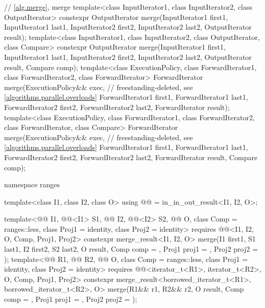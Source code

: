 \begin{codeblock}
{  // \ref{alg.merge}, merge
  template<class InputIterator1, class InputIterator2, class OutputIterator>
    constexpr OutputIterator
      merge(InputIterator1 first1, InputIterator1 last1,
            InputIterator2 first2, InputIterator2 last2,
            OutputIterator result);
  template<class InputIterator1, class InputIterator2, class OutputIterator,
           class Compare>
    constexpr OutputIterator
      merge(InputIterator1 first1, InputIterator1 last1,
            InputIterator2 first2, InputIterator2 last2,
            OutputIterator result, Compare comp);
  template<class ExecutionPolicy, class ForwardIterator1, class ForwardIterator2,
           class ForwardIterator>
    ForwardIterator
      merge(ExecutionPolicy&& exec,                             // freestanding-deleted, see \ref{algorithms.parallel.overloads}
            ForwardIterator1 first1, ForwardIterator1 last1,
            ForwardIterator2 first2, ForwardIterator2 last2,
            ForwardIterator result);
  template<class ExecutionPolicy, class ForwardIterator1, class ForwardIterator2,
           class ForwardIterator, class Compare>
    ForwardIterator
      merge(ExecutionPolicy&& exec,                             // freestanding-deleted, see \ref{algorithms.parallel.overloads}
            ForwardIterator1 first1, ForwardIterator1 last1,
            ForwardIterator2 first2, ForwardIterator2 last2,
            ForwardIterator result, Compare comp);

  namespace ranges {
    template<class I1, class I2, class O>
      using @@ = in_in_out_result<I1, I2, O>;

    template<@@ I1, @@<I1> S1, @@ I2, @@<I2> S2,
             @@ O, class Comp = ranges::less, class Proj1 = identity,
             class Proj2 = identity>
      requires @@<I1, I2, O, Comp, Proj1, Proj2>
      constexpr merge_result<I1, I2, O>
        merge(I1 first1, S1 last1, I2 first2, S2 last2, O result,
              Comp comp = {}, Proj1 proj1 = {}, Proj2 proj2 = {});
    template<@@ R1, @@ R2, @@ O, class Comp = ranges::less,
             class Proj1 = identity, class Proj2 = identity>
      requires @@<iterator_t<R1>, iterator_t<R2>, O, Comp, Proj1, Proj2>
      constexpr merge_result<borrowed_iterator_t<R1>, borrowed_iterator_t<R2>, O>
        merge(R1&& r1, R2&& r2, O result,
              Comp comp = {}, Proj1 proj1 = {}, Proj2 proj2 = {});

}}
\end{codeblock}
